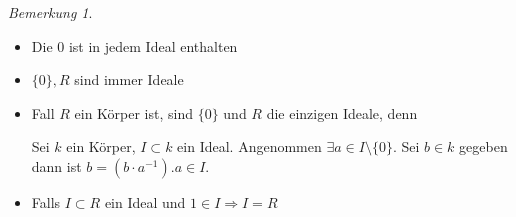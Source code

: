 \documentclass[12pt,parskip=full]{scrartcl}
\theoremstyle{definition}
\theoremstyle{remark}
\newtheorem*{remark}{Bemerkung}
\begin{document}
	\begin{remark}
		\begin{itemize}
			\item Die $0$ ist in jedem Ideal enthalten
			\item $\{ 0 \}, R$ sind immer Ideale
			\item Fall $R$ ein Körper ist, sind $\{ 0 \}$ und $R$ die einzigen Ideale, denn
			
			Sei $k$ ein Körper, $I \subset k$ ein Ideal. Angenommen $\exists a \in I \setminus \{ 0 \}$. Sei $b \in k$ gegeben dann ist $b = (b \cdot a^{-1}). a \in I$.
			
			\item Falls $I \subset R$ ein Ideal und $1 \in I \Rightarrow I = R$
		\end{itemize}
	\end{remark}
\end{document}
